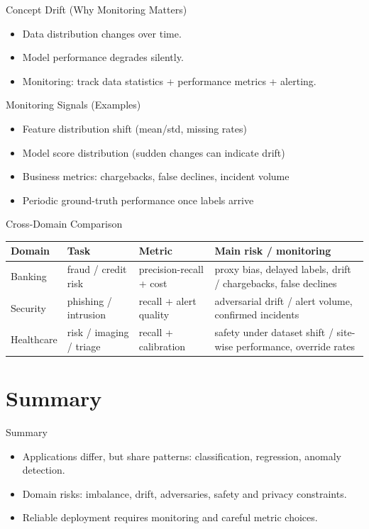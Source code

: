 \documentclass[aspectratio=169]{beamer}
\begin{document}
\begin{frame}{Concept Drift (Why Monitoring Matters)}
  \begin{itemize}[<+->]
    \item Data distribution changes over time.
    \item Model performance degrades silently.
    \item Monitoring: track data statistics + performance metrics + alerting.
  \end{itemize}
\end{frame}

\begin{frame}{Monitoring Signals (Examples)}
  \begin{itemize}[<+->]
    \item Feature distribution shift (mean/std, missing rates)
    \item Model score distribution (sudden changes can indicate drift)
    \item Business metrics: chargebacks, false declines, incident volume
    \item Periodic ground-truth performance once labels arrive
  \end{itemize}
\end{frame}

\begin{frame}{Cross-Domain Comparison}
  \scriptsize
  \begin{tabular}{p{1.9cm}p{2.3cm}p{2.2cm}p{4.8cm}}
    \toprule
    \textbf{Domain} & \textbf{Task} & \textbf{Metric} & \textbf{Main risk / monitoring} \\
    \midrule
    Banking & fraud / credit risk & precision-recall + cost & proxy bias, delayed labels, drift / chargebacks, false declines \\
    Security & phishing / intrusion & recall + alert quality & adversarial drift / alert volume, confirmed incidents \\
    Healthcare & risk / imaging / triage & recall + calibration & safety under dataset shift / site-wise performance, override rates \\
    \bottomrule
  \end{tabular}
\end{frame}

\section{Summary}
\label{sec:summary}

\begin{frame}{Summary}
  \begin{itemize}
    \item Applications differ, but share patterns: classification, regression, anomaly detection.
    \item Domain risks: imbalance, drift, adversaries, safety and privacy constraints.
    \item Reliable deployment requires monitoring and careful metric choices.
  \end{itemize}
  \slidesources{\AIMLUnitVSources}
\end{frame}
\end{document}
